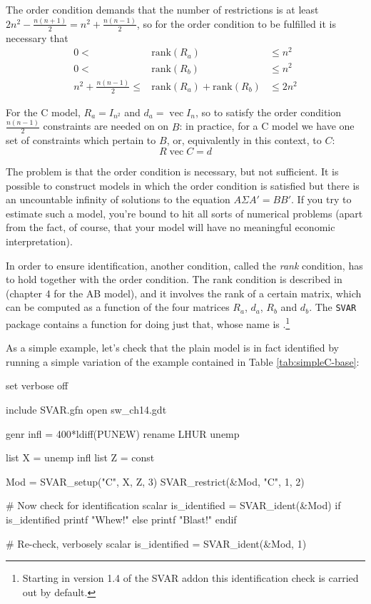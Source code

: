\documentclass[a4paper,10pt]{article}
\newcommand{\dtk}[1]{\texttt{\detokenize{#1}}}
\DeclareMathOperator{\VEC}{\mathrm{vec}}
\newcommand{\rk}[1]{\mathrm{rank}\left(#1\right)}
\begin{document}
The order condition demands that the number of restrictions is at
least $2 n^2 - \frac{n (n+1)}{2} = n^2 + \frac{n (n-1)}{2}$, so for
the order condition to be fulfilled it is necessary that
\begin{eqnarray*}
  0 < & \rk{R_a} & \le n^2 \\
  0 < & \rk{R_b} & \le n^2 \\
  n^2 + \frac{n (n-1)}{2} \le & \rk{R_a} + \rk{R_b} & \le 2 n^2
\end{eqnarray*}

For the C model, $R_a = I_{n^2}$ and $d_a = \VEC I_n$, so to satisfy
the order condition $\frac{n (n-1)}{2}$ constraints are needed on on
$B$: in practice, for a C model we have one set of constraints which
pertain to $B$, or, equivalently in this context, to $C$:
\begin{equation}
  \label{eq:ImpConstC}
  R \VEC C = d
\end{equation}

The problem is that the order condition is necessary, but not
sufficient. It is possible to construct models in which the order
condition is satisfied but there is an uncountable infinity of
solutions to the equation $A \Sigma A' = B B'$. If you try to estimate
such a model, you're bound to hit all sorts of numerical problems
(apart from the fact, of course, that your model will have no
meaningful economic interpretation).

In order to ensure identification, another condition, called the
\emph{rank} condition, has to hold together with the order
condition. The rank condition is described in \cite{AG} (chapter 4 for
the AB model), and it involves the rank of a certain matrix, which can
be computed as a function of the four matrices $R_a$, $d_a$, $R_b$ and
$d_b$. The \texttt{SVAR} package contains a function for doing just
that, whose name is \dtk{SVAR_ident}.\footnote{Starting in version 1.4 
of the SVAR addon this identification check is carried out by default.}

As a simple example, let's check that the plain model is in fact
identified by running a simple variation of the example contained in
Table \ref{tab:simpleC-base}: 

\begin{code}
set verbose off

include SVAR.gfn
open sw_ch14.gdt

genr infl = 400*ldiff(PUNEW)
rename LHUR unemp

list X = unemp infl
list Z = const

Mod = SVAR_setup("C", X, Z, 3)
SVAR_restrict(&Mod, "C", 1, 2)

# Now check for identification
scalar is_identified = SVAR_ident(&Mod)
if is_identified
    printf "Whew!\n"
else
    printf "Blast!\n"
endif

# Re-check, verbosely
scalar is_identified = SVAR_ident(&Mod, 1)
\end{code}
\end{document}
